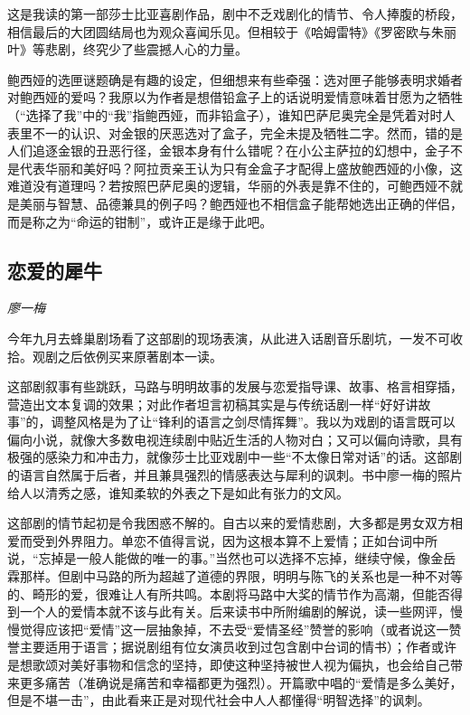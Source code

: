 \par 这是我读的第一部莎士比亚喜剧作品，剧中不乏戏剧化的情节、令人捧腹的桥段，相信最后的大团圆结局也为观众喜闻乐见。但相较于《哈姆雷特》《罗密欧与朱丽叶》等悲剧，终究少了些震撼人心的力量。
\par 鲍西娅的选匣谜题确是有趣的设定，但细想来有些牵强：选对匣子能够表明求婚者对鲍西娅的爱吗？我原以为作者是想借铅盒子上的话说明爱情意味着甘愿为之牺牲（“选择了我”中的“我”指鲍西娅，而非铅盒子），谁知巴萨尼奥完全是凭着对时人表里不一的认识、对金银的厌恶选对了盒子，完全未提及牺牲二字。然而，错的是人们追逐金银的丑恶行径，金银本身有什么错呢？在小公主萨拉的幻想中，金子不是代表华丽和美好吗？阿拉贡亲王认为只有金盒子才配得上盛放鲍西娅的小像，这难道没有道理吗？若按照巴萨尼奥的逻辑，华丽的外表是靠不住的，可鲍西娅不就是美丽与智慧、品德兼具的例子吗？鲍西娅也不相信盒子能帮她选出正确的伴侣，而是称之为“命运的钳制”，或许正是缘于此吧。
\par {}

\subsection*{恋爱的犀牛}
\par \emph{廖一梅}

\par 今年九月去蜂巢剧场看了这部剧的现场表演，从此进入话剧音乐剧坑，一发不可收拾。观剧之后依例买来原著剧本一读。
\par 这部剧叙事有些跳跃，马路与明明故事的发展与恋爱指导课、故事、格言相穿插，营造出文本复调的效果；对此作者坦言初稿其实是与传统话剧一样“好好讲故事”的，调整风格是为了让“锋利的语言之剑尽情挥舞”。我以为戏剧的语言既可以偏向小说，就像大多数电视连续剧中贴近生活的人物对白；又可以偏向诗歌，具有极强的感染力和冲击力，就像莎士比亚戏剧中一些“不太像日常对话”的话。这部剧的语言自然属于后者，并且兼具强烈的情感表达与犀利的讽刺。书中廖一梅的照片给人以清秀之感，谁知柔软的外表之下是如此有张力的文风。
\par 这部剧的情节起初是令我困惑不解的。自古以来的爱情悲剧，大多都是男女双方相爱而受到外界阻力。单恋不值得言说，因为这根本算不上爱情；正如台词中所说，“忘掉是一般人能做的唯一的事。”当然也可以选择不忘掉，继续守候，像金岳霖那样。但剧中马路的所为超越了道德的界限，明明与陈飞的关系也是一种不对等的、畸形的爱，很难让人有所共鸣。本剧将马路中大奖的情节作为高潮，但能否得到一个人的爱情本就不该与此有关。后来读书中所附编剧的解说，读一些网评，慢慢觉得应该把“爱情”这一层抽象掉，不去受“爱情圣经”赞誉的影响（或者说这一赞誉主要适用于语言；据说剧组有位女演员收到过包含剧中台词的情书）；作者或许是想歌颂对美好事物和信念的坚持，即使这种坚持被世人视为偏执，也会给自己带来更多痛苦（准确说是痛苦和幸福都更为强烈）。开篇歌中唱的“爱情是多么美好，但是不堪一击”，由此看来正是对现代社会中人人都懂得“明智选择”的讽刺。

